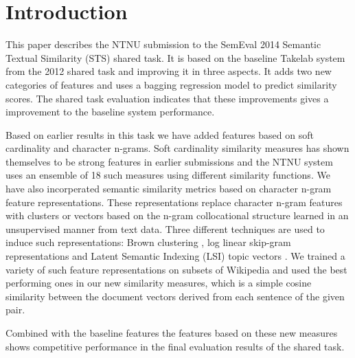 \section{Introduction}
\label{intro}


This paper describes the NTNU submission to the SemEval 2014 Semantic Textual Similarity (STS) shared task. It is based on  the baseline Takelab system from the 2012 shared task and improving it in three aspects. It adds two new categories of features and uses a bagging regression model to predict similarity scores. The shared task evaluation indicates that these improvements gives a improvement to the baseline system performance.

Based on earlier results in this task we have added features based on soft cardinality and character n-grams. Soft cardinality similarity measures has shown themselves to be strong features in earlier submissions \cite{jimenez_softcardinality-core:_2013} and the NTNU system uses an ensemble of 18 such measures using different similarity functions.
We have also incorperated semantic similarity metrics based on character n-gram feature representations. These representations replace character n-gram features with clusters or vectors based on the n-gram collocational structure learned in an unsupervised manner from text data. Three different techniques are used to induce such representations: Brown clustering \cite{brown1992class}, log linear skip-gram representations \cite{mikolov2013efficient} and Latent Semantic Indexing (LSI) topic vectors \cite{deerwester1990indexing}. We trained a variety of such feature representations on subsets of Wikipedia and used the best performing ones in our new similarity measures, which is a simple cosine similarity between the document vectors derived from each sentence of the given pair.

Combined with the baseline features the features based on these new measures shows competitive performance in the final evaluation results of the shared task.

